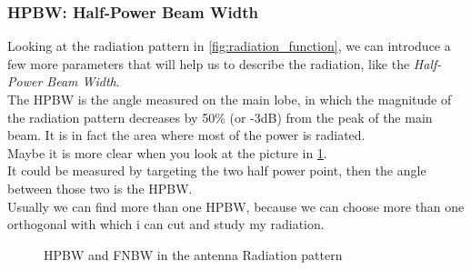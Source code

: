 \subsubsection*{HPBW: Half-Power Beam Width}
Looking at the radiation pattern in \cref{fig:radiation_function}, we can introduce a few more parameters that will help us to describe the radiation, like the \emph{Half-Power Beam Width}.\\
The HPBW is the angle measured on the main lobe, in which the magnitude of the radiation pattern decreases by 50\% (or -3dB) from the peak of the main beam. It is in fact the area where most of the power is radiated.\\
Maybe it is more clear when you look at the picture in \cref{fig:beam_width_2d}.\\
It could be measured by targeting the two half power point, then the angle between those two is the HPBW.\\
Usually we can find more than one HPBW, because we can choose more than one orthogonal with which i can cut and study my radiation.
\begin{figure}[H]
    \begin{center}
    \end{center} \caption{HPBW and FNBW in the antenna Radiation pattern}\label{fig:beam_width_2d} 
\end{figure}
